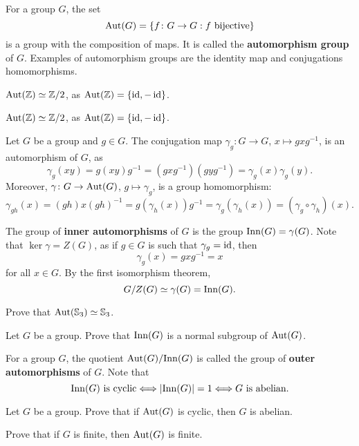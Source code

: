 For a group $G$, 
the set 
\[
\operatorname{Aut}(G)=\{f\colon G\to G:f\text{ bijective}\}
\]
is a group with the composition of maps. It is called 
the \textbf{automorphism group} of $G$. 
Examples of automorphism groups are the identity map and 
conjugations homomorphisms. 

\begin{example}
$\operatorname{Aut}(\mathbb{Z})\simeq\mathbb{Z}/2$, as $\operatorname{Aut}(\mathbb{Z})=\{\operatorname{id},-\operatorname{id}\}$.
\end{example}

\begin{example}
$\operatorname{Aut}(\mathbb{Z})\simeq\mathbb{Z}/2$, as $\operatorname{Aut}(\mathbb{Z})=\{\operatorname{id},-\operatorname{id}\}$.
\end{example}

\begin{example}
Let $G$ be a group and $g\in G$. The conjugation 
map $\gamma_g\colon G\to G$, $x\mapsto gxg^{-1}$,
is an automorphism of $G$, as 
\[
\gamma_g(xy)=g(xy)g^{-1}=(gxg^{-1})(gyg^{-1})=\gamma_g(x)\gamma_g(y).
\]
Moreover, $\gamma\colon G\to\operatorname{Aut}(G)$, $g\mapsto\gamma_g$, is a group
homomorphism:
\[
\gamma_{gh}(x)=(gh)x(gh)^{-1}=g(\gamma_h(x))g^{-1}=\gamma_g(\gamma_h(x))=(\gamma_g\circ\gamma_h)(x).
\]

The group of \textbf{inner automorphisms} of $G$ is the 
group 
$\mathrm{Inn}(G)=\gamma(G)$. Note that $\ker\gamma=Z(G)$, as
if $g\in G$ is such that $\gamma_g=\operatorname{id}$, then 
\[
\gamma_g(x)=gxg^{-1}=x
\]
for all $x\in G$. By the first isomorphism theorem, 
\[
G/Z(G)\simeq \gamma(G)=\mathrm{Inn}(G).
\]
\end{example}

\begin{exercise}
\label{xca:aut(S3)}
    Prove that $\operatorname{Aut}(\mathbb{S}_3)\simeq\mathbb{S}_3$. 
\end{exercise}

\begin{exercise}
    Let $G$ be a group. Prove that $\mathrm{Inn}(G)$ is a normal subgroup of $\operatorname{Aut}(G)$. 
\end{exercise} 

For a group $G$, the quotient $\operatorname{Aut}(G)/\mathrm{Inn}(G)$ is called 
the group of \textbf{outer automorphisms} of $G$. 
Note that 
\[
\mathrm{Inn}(G)\text{ is cyclic}\Longleftrightarrow
|\mathrm{Inn}(G)|=1\Longleftrightarrow
G\text{ is abelian.}
\]

\begin{exercise}
Let $G$ be a group. 
Prove that if $\operatorname{Aut}(G)$ is cyclic, then 
$G$ is abelian. 
\end{exercise}

\begin{exercise}
    Prove that if $G$ is finite, then $\operatorname{Aut}(G)$ is finite.
\end{exercise}


